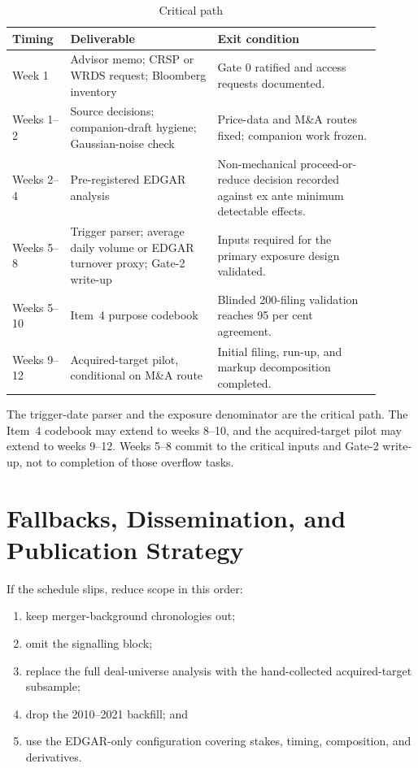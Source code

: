 \begin{table}[htbp]
\centering
\small
\caption{Critical path}
\label{tab:critical-path}
\begin{tabular}{@{}p{0.14\linewidth}p{0.36\linewidth}p{0.40\linewidth}@{}}
\toprule
Timing & Deliverable & Exit condition \\
\midrule
Week 1 & Advisor memo; CRSP or WRDS request; Bloomberg inventory & Gate 0
ratified and access requests documented. \\
Weeks 1--2 & Source decisions; companion-draft hygiene; Gaussian-noise check &
Price-data and M\&A routes fixed; companion work frozen. \\
Weeks 2--4 & Pre-registered EDGAR analysis & Non-mechanical proceed-or-reduce
decision recorded against ex ante minimum detectable effects. \\
Weeks 5--8 & Trigger parser; average daily volume or EDGAR turnover proxy;
Gate-2 write-up & Inputs required for the primary exposure design validated. \\
Weeks 5--10 & Item~4 purpose codebook & Blinded 200-filing validation reaches
95 per cent agreement. \\
Weeks 9--12 & Acquired-target pilot, conditional on M\&A route & Initial
filing, run-up, and markup decomposition completed. \\
\bottomrule
\end{tabular}
\end{table}

The trigger-date parser and the exposure denominator are the critical path.
The Item~4 codebook may extend to weeks 8--10, and the acquired-target pilot may
extend to weeks 9--12. Weeks 5--8 commit to the critical inputs and Gate-2
write-up, not to completion of those overflow tasks.

\clearpage
\section{Fallbacks, Dissemination, and Publication Strategy}
\label{sec:plan-fallbacks}

If the schedule slips, reduce scope in this order:
\begin{enumerate}
\item keep merger-background chronologies out;
\item omit the signalling block;
\item replace the full deal-universe analysis with the hand-collected
acquired-target subsample;
\item drop the 2010--2021 backfill; and
\item use the EDGAR-only configuration covering stakes, timing, composition,
and derivatives.
\end{enumerate}

